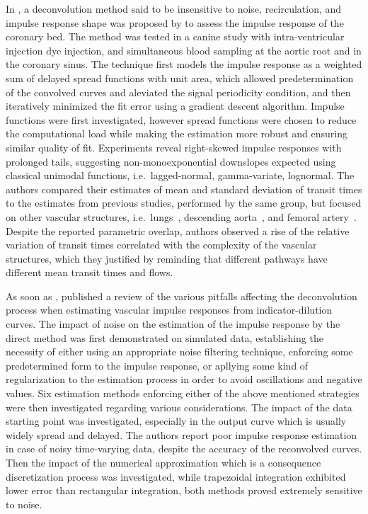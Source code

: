 In \citeyear{Knopp:1976uc}, a deconvolution method said to be insensitive to noise, recirculation, and impulse response shape was proposed by \citet{Knopp:1976uc} to assess the impulse response of the coronary bed.
The method was tested in a canine study with intra-ventricular injection dye injection, and simultaneous blood sampling at the aortic root and in the coronary sinus.
The technique first models the impulse response as a weighted sum of delayed spread functions with unit area, which allowed predetermination of the convolved curves and aleviated the signal periodicity condition, and then iteratively minimized the fit error using a gradient descent algorithm.
Impulse functions were first investigated, however spread functions were chosen to reduce the computational load while making the estimation more robust and ensuring similar quality of fit.
Experiments reveal right-skewed impulse responses with prolonged tails, suggesting non-monoexponential downslopes expected using classical unimodal functions, i.e.~lagged-normal, gamma-variate, lognormal.
The authors compared their estimates of mean and standard deviation of transit times to the estimates from previous studies, performed by the same group, but focused on other vascular structures, i.e.~lungs~\cite{Knopp:1969tu}, descending aorta~\cite{Bassingthwaighte:1967vy}, and femoral artery~\cite{Bassingthwaighte:1966jn}. 
Despite the reported parametric overlap, authors observed a rise of the relative variation of transit times correlated with the complexity of the vascular structures, which they justified by reminding that different pathways have different mean transit times and flows.

As soon as \citeyear{Gamel:1973uz}, \citet{Gamel:1973uz} published a review of the various pitfalls affecting the deconvolution process when estimating vascular impulse responses from indicator-dilution curves. 
The impact of noise on the estimation of the impulse response by the direct method was first demonstrated on simulated data, establishing the necessity of either using an appropriate noise filtering technique, enforcing some predetermined form to the impulse response, or apllying some kind of regularization to the estimation process in order to avoid oscillations and negative values.
Six estimation methods enforcing either of the above mentioned strategies were then investigated regarding various considerations.
The impact of the data starting point was investigated, especially in the output curve which is usually widely spread and delayed.
The authors report poor impulse response estimation in case of noisy time-varying data, despite the accuracy of the reconvolved curves.
Then the impact of the numerical approximation which is a consequence discretization process was investigated, while trapezoidal integration exhibited lower error than rectangular integration, both methods proved extremely sensitive to noise. 

